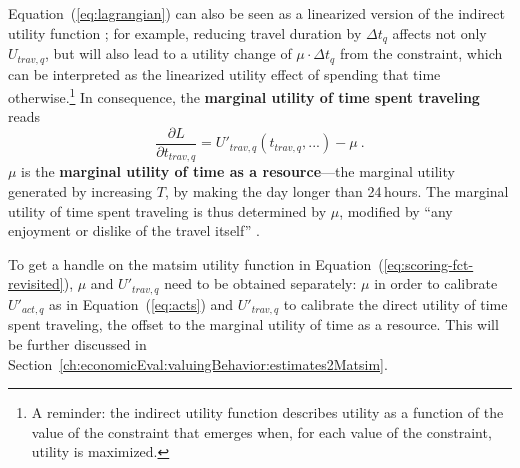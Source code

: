 Equation~(\ref{eq:lagrangian}) can also be seen as a linearized version of the indirect utility function%
%
%
%
%
; for example, reducing travel duration by $\Delta t_q$ affects not only $U_{trav,q}$, but will also lead to a utility change of $ \mu \cdot \Delta t_q$ from the constraint, which can be interpreted as the linearized utility effect of spending that time otherwise.\footnote{%
%
A reminder: the indirect utility function describes utility as a function of the value of the constraint that emerges when, for each value of the constraint, utility is maximized.
%
}
%
In consequence, the \textbf{marginal utility of time spent traveling} reads
%
\begin{equation}
\frac{\partial L}{\partial t_{trav,q}} = U'_{trav,q}(t_{trav,q},...) - \mu \ .
\label{eq:marg-UoT}
\end{equation}
%
$\mu$ is the \textbf{marginal utility of time as a resource}---the marginal utility generated by increasing $T$, \ie by making the day longer than 24\,hours. The marginal utility of time spent traveling is thus determined by $\mu$, modified by ``any enjoyment or dislike of the travel itself'' \citep{Small2012ValuationOfTimeRevisited}.

To get a handle on the \acrshort{matsim} utility function in Equation~(\ref{eq:scoring-fct-revisited}), $\mu$ and $U'_{trav,q}$ need to be obtained separately: $\mu$ in order to calibrate $U'_{act,q}$ as in Equation~(\ref{eq:acts}) and $U'_{trav,q}$ to calibrate the direct utility of time spent traveling, the offset to the marginal utility of time as a resource.
%
This will be further discussed in Section~\ref{ch:economicEval:valuingBehavior:estimates2Matsim}.


